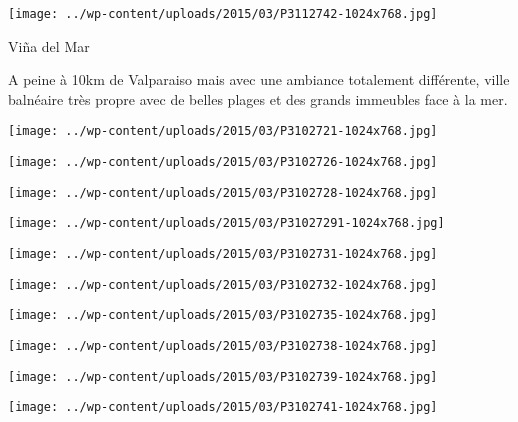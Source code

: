 \begin{center} \texttt{[image: ../wp-content/uploads/2015/03/P3112742-1024x768.jpg]} \end{center}



 Viña del Mar 

 A peine à 10km de Valparaiso mais avec une ambiance totalement différente, ville balnéaire très propre avec de belles plages et des grands immeubles face à la mer.

 

\begin{center} \texttt{[image: ../wp-content/uploads/2015/03/P3102721-1024x768.jpg]} \end{center}

 

\begin{center} \texttt{[image: ../wp-content/uploads/2015/03/P3102726-1024x768.jpg]} \end{center}

 

\begin{center} \texttt{[image: ../wp-content/uploads/2015/03/P3102728-1024x768.jpg]} \end{center}

 

\begin{center} \texttt{[image: ../wp-content/uploads/2015/03/P31027291-1024x768.jpg]} \end{center}

 

\begin{center} \texttt{[image: ../wp-content/uploads/2015/03/P3102731-1024x768.jpg]} \end{center}

 

\begin{center} \texttt{[image: ../wp-content/uploads/2015/03/P3102732-1024x768.jpg]} \end{center}

 

\begin{center} \texttt{[image: ../wp-content/uploads/2015/03/P3102735-1024x768.jpg]} \end{center}

 

\begin{center} \texttt{[image: ../wp-content/uploads/2015/03/P3102738-1024x768.jpg]} \end{center}

 

\begin{center} \texttt{[image: ../wp-content/uploads/2015/03/P3102739-1024x768.jpg]} \end{center}

 

\begin{center} \texttt{[image: ../wp-content/uploads/2015/03/P3102741-1024x768.jpg]} \end{center}




 
 
